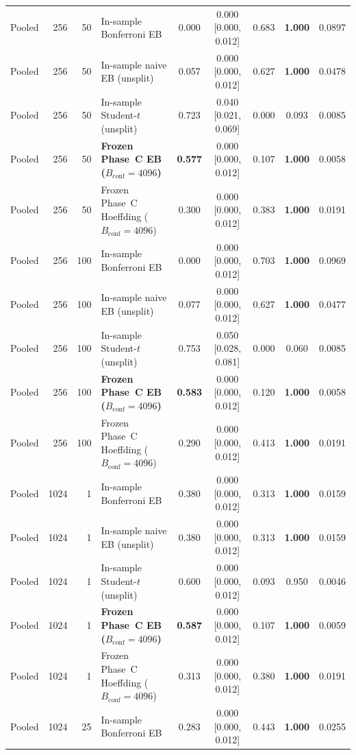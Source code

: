 \begin{table}[htbp]
\begin{tabular}{@{}l r r l c c c c c@{}}
Pooled & 256 & 50 & In-sample Bonferroni EB & 0.000 & 0.000 [0.000, 0.012] & 0.683 & \textbf{1.000} & 0.0897 \\
Pooled & 256 & 50 & In-sample naive EB (unsplit) & 0.057 & 0.000 [0.000, 0.012] & 0.627 & \textbf{1.000} & 0.0478 \\
Pooled & 256 & 50 & In-sample Student-$t$ (unsplit) & 0.723 & 0.040 [0.021, 0.069] & 0.000 & 0.093 & 0.0085 \\
Pooled & 256 & 50 & \textbf{Frozen Phase~C EB ($B_{\mathrm{conf}}=4096$)} & \textbf{0.577} & 0.000 [0.000, 0.012] & 0.107 & \textbf{1.000} & 0.0058 \\
Pooled & 256 & 50 & Frozen Phase~C Hoeffding ($B_{\mathrm{conf}}=4096$) & 0.300 & 0.000 [0.000, 0.012] & 0.383 & \textbf{1.000} & 0.0191 \\
Pooled & 256 & 100 & In-sample Bonferroni EB & 0.000 & 0.000 [0.000, 0.012] & 0.703 & \textbf{1.000} & 0.0969 \\
Pooled & 256 & 100 & In-sample naive EB (unsplit) & 0.077 & 0.000 [0.000, 0.012] & 0.627 & \textbf{1.000} & 0.0477 \\
Pooled & 256 & 100 & In-sample Student-$t$ (unsplit) & 0.753 & 0.050 [0.028, 0.081] & 0.000 & 0.060 & 0.0085 \\
Pooled & 256 & 100 & \textbf{Frozen Phase~C EB ($B_{\mathrm{conf}}=4096$)} & \textbf{0.583} & 0.000 [0.000, 0.012] & 0.120 & \textbf{1.000} & 0.0058 \\
Pooled & 256 & 100 & Frozen Phase~C Hoeffding ($B_{\mathrm{conf}}=4096$) & 0.290 & 0.000 [0.000, 0.012] & 0.413 & \textbf{1.000} & 0.0191 \\
Pooled & 1024 & 1 & In-sample Bonferroni EB & 0.380 & 0.000 [0.000, 0.012] & 0.313 & \textbf{1.000} & 0.0159 \\
Pooled & 1024 & 1 & In-sample naive EB (unsplit) & 0.380 & 0.000 [0.000, 0.012] & 0.313 & \textbf{1.000} & 0.0159 \\
Pooled & 1024 & 1 & In-sample Student-$t$ (unsplit) & 0.600 & 0.000 [0.000, 0.012] & 0.093 & 0.950 & 0.0046 \\
Pooled & 1024 & 1 & \textbf{Frozen Phase~C EB ($B_{\mathrm{conf}}=4096$)} & \textbf{0.587} & 0.000 [0.000, 0.012] & 0.107 & \textbf{1.000} & 0.0059 \\
Pooled & 1024 & 1 & Frozen Phase~C Hoeffding ($B_{\mathrm{conf}}=4096$) & 0.313 & 0.000 [0.000, 0.012] & 0.380 & \textbf{1.000} & 0.0191 \\
Pooled & 1024 & 25 & In-sample Bonferroni EB & 0.283 & 0.000 [0.000, 0.012] & 0.443 & \textbf{1.000} & 0.0255 \\

\end{tabular}
\end{table}
